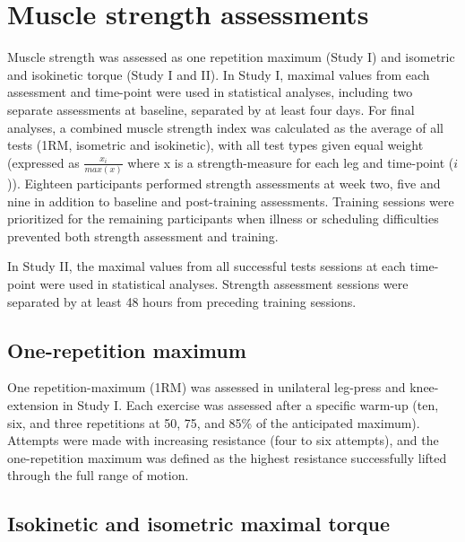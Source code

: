 \documentclass[twoside,10pt]{gihclass} %
\begin{document}
\hypertarget{muscle-strength-assessments}{%
\section{Muscle strength assessments}\label{muscle-strength-assessments}}

Muscle strength was assessed as one repetition maximum (Study I) and isometric and isokinetic torque (Study I and II). In Study I, maximal values from each assessment and time-point were used in statistical analyses, including two separate assessments at baseline, separated by at least four days. For final analyses, a combined muscle strength index was calculated as the average of all tests (1RM, isometric and isokinetic), with all test types given equal weight (expressed as \(\frac{x_i}{max(x)}\) where x is a strength-measure for each leg and time-point (\(i\))). Eighteen participants performed strength assessments at week two, five and nine in addition to baseline and post-training assessments. Training sessions were prioritized for the remaining participants when illness or scheduling difficulties prevented both strength assessment and training.

In Study II, the maximal values from all successful tests sessions at each time-point were used in statistical analyses. Strength assessment sessions were separated by at least 48 hours from preceding training sessions.

\hypertarget{one-repetition-maximum}{%
\subsection{One-repetition maximum}\label{one-repetition-maximum}}

One repetition-maximum (1RM) was assessed in unilateral leg-press and knee-extension in Study I.
Each exercise was assessed after a specific warm-up (ten, six, and three repetitions at 50, 75, and 85\% of the anticipated maximum). Attempts were made with increasing resistance (four to six attempts), and the one-repetition maximum was defined as the highest resistance successfully lifted through the full range of motion.

\hypertarget{isokinetic-and-isometric-maximal-torque}{%
\subsection{Isokinetic and isometric maximal torque}\label{isokinetic-and-isometric-maximal-torque}}
\end{document}
